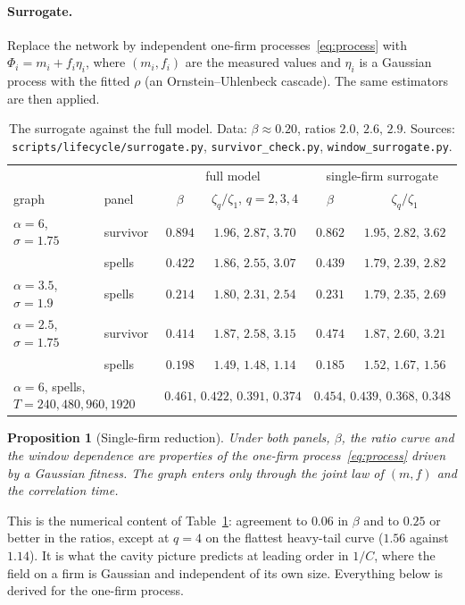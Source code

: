 \documentclass[11pt]{article}
\newtheorem{proposition}{Proposition}
\theoremstyle{remark}
\begin{document}
\paragraph{Surrogate.}  Replace the network by independent one-firm processes~\eqref{eq:process} with
$\Phi_i=m_i+f_i\eta_i$, where $(m_i,f_i)$ are the measured values and $\eta_i$ is a Gaussian process with the
fitted $\rho$ (an Ornstein--Uhlenbeck cascade).  The same estimators are then applied.

\begin{table}[h]
\centering\small\setlength{\tabcolsep}{4pt}
\begin{tabular}{ll|cc|cc}
\toprule
 & & \multicolumn{2}{c|}{full model} & \multicolumn{2}{c}{single-firm surrogate}\\
graph & panel & $\beta$ & $\zeta_q/\zeta_1$, $q=2,3,4$ & $\beta$ & $\zeta_q/\zeta_1$\\
\midrule
$\alpha=6$, $\sigma=1.75$ & survivor & $0.894$ & $1.96,\,2.87,\,3.70$ & $0.862$ & $1.95,\,2.82,\,3.62$\\
                          & spells   & $0.422$ & $1.86,\,2.55,\,3.07$ & $0.439$ & $1.79,\,2.39,\,2.82$\\
$\alpha=3.5$, $\sigma=1.9$ & spells  & $0.214$ & $1.80,\,2.31,\,2.54$ & $0.231$ & $1.79,\,2.35,\,2.69$\\
$\alpha=2.5$, $\sigma=1.75$ & survivor & $0.414$ & $1.87,\,2.58,\,3.15$ & $0.474$ & $1.87,\,2.60,\,3.21$\\
                          & spells   & $0.198$ & $1.49,\,1.48,\,1.14$ & $0.185$ & $1.52,\,1.67,\,1.56$\\
\midrule
\multicolumn{2}{l|}{$\alpha=6$, spells, $T=240,480,960,1920$} & \multicolumn{2}{c|}{$0.461,\,0.422,\,0.391,\,0.374$}
 & \multicolumn{2}{c}{$0.454,\,0.439,\,0.368,\,0.348$}\\
\bottomrule
\end{tabular}
\caption{The surrogate against the full model.  Data: $\beta\approx0.20$, ratios $2.0,\,2.6,\,2.9$.  Sources:
\texttt{scripts/lifecycle/surrogate.py}, \texttt{survivor\_check.py}, \texttt{window\_surrogate.py}.}
\label{tab:surrogate}
\end{table}

\begin{proposition}[Single-firm reduction]\label{prop:reduction}
Under both panels, $\beta$, the ratio curve and the window dependence are properties of the one-firm
process~\eqref{eq:process} driven by a Gaussian fitness.  The graph enters only through the joint law of $(m,f)$
and the correlation time.
\end{proposition}
This is the numerical content of Table~\ref{tab:surrogate}: agreement to $0.06$ in $\beta$ and to $0.25$ or
better in the ratios, except at $q=4$ on the flattest heavy-tail curve ($1.56$ against $1.14$).  It is what the cavity picture predicts at leading order
in $1/C$, where the field on a firm is Gaussian and independent of its own size.  Everything below is derived for
the one-firm process.
\end{document}
